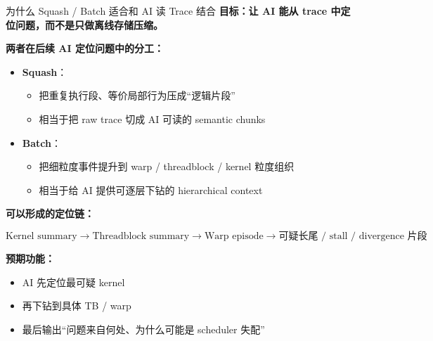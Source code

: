 \documentclass[aspectratio=169]{beamer}
\begin{document}
\begin{frame}{为什么 Squash / Batch 适合和 AI 读 Trace 结合}
\textbf{目标：让 AI 能从 trace 中定位问题，而不是只做离线存储压缩。}

\vspace{0.6em}
\textbf{两者在后续 AI 定位问题中的分工：}
\begin{itemize}
  \item \textbf{Squash}：
  \begin{itemize}
    \item 把重复执行段、等价局部行为压成“逻辑片段”
    \item 相当于把 raw trace 切成 AI 可读的 semantic chunks
  \end{itemize}
  \item \textbf{Batch}：
  \begin{itemize}
    \item 把细粒度事件提升到 warp / threadblock / kernel 粒度组织
    \item 相当于给 AI 提供可逐层下钻的 hierarchical context
  \end{itemize}
\end{itemize}

\vspace{0.6em}
\textbf{可以形成的定位链：}

\[
\text{Kernel summary} \rightarrow
\text{Threadblock summary} \rightarrow
\text{Warp episode} \rightarrow
\text{可疑长尾 / stall / divergence 片段}
\]

\vspace{0.6em}
\textbf{预期功能：}
\begin{itemize}
  \item AI 先定位最可疑 kernel
  \item 再下钻到具体 TB / warp
  \item 最后输出“问题来自何处、为什么可能是 scheduler 失配”
\end{itemize}
\end{frame}
\end{document}
